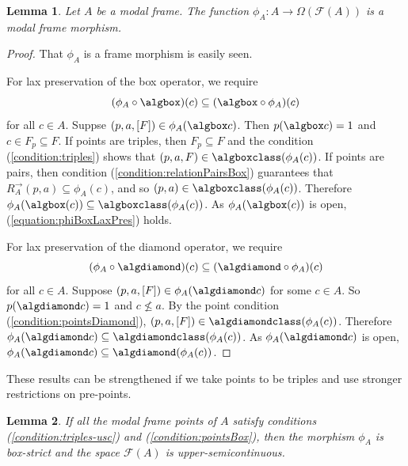 \documentclass{article}[a4paper]
\newtheorem{lemma}{Lemma}%
\theoremstyle{definition}
\newcommand{\Fcal}{\mathcal{F}} %
\newcommand{\relsp}{\mathbf{RelSp}}
\newcommand{\mfrm}{\mathbf{MFrm}}
\newcommand{\dirim}{^{\rightarrow\!}}
\begin{document}
\begin{lemma}
Let $A$ be a modal frame. The function $\phi _A : A \longrightarrow \Omega (\Fcal (A))$ is a modal frame morphism. 
\end{lemma}

\begin{proof}
    That $\phi_A$ is a frame morphism is easily seen. 
    
    For lax preservation of the box operator, we require
    \begin{equation}
    \label{equation:phiBoxLaxPres}
        (\phi_A \circ \algbox )(c)\subseteq (\algbox \circ \phi _A)(c) 
    \end{equation}
    for all $c \in A$. 
    Suppse $(p,a,[F]) \in \phi_A ( \algbox c)$. Then $p(\algbox c)=1$ and $c \in F_p \subseteq F$. 
    If points are triples, then $F_p \subseteq F$ and the condition (\ref{condition:triples}) shows that $(p,a,F) \in \algboxclass (\phi_A(c))$. 
    If points are pairs, then condition (\ref{condition:relationPairsBox}) guarantees that $R_A \dirim (p,a) \subseteq \phi_A (c)$, and so  $(p,a) \in \algboxclass (\phi_A(c))$.
    Therefore $\phi_A (\algbox (c))\subseteq \algboxclass (\phi _A (c))$. As $\phi_A (\algbox (c))$ is open, (\ref{equation:phiBoxLaxPres}) holds.

    For lax preservation of the diamond operator, 
    we require
    \begin{equation}
    \label{equation:phiDiamondLaxPres}
        (\phi_A \circ \algdiamond)(c) \subseteq (\algdiamond \circ \phi _A )(c)
    \end{equation}
    for all $c \in A$. 
    Suppose $(p,a,[F]) \in \phi_A (\algdiamond c)$ for some $c \in A$. So $p(\algdiamond c)=1$ and $c\nleq a$. By the point condition (\ref{condition:pointsDiamond}), $(p,a,[F]) \in \algdiamondclass (\phi_A (c))$. Therefore $\phi_A (\algdiamond c) \subseteq \algdiamondclass (\phi_A (c))$. As 
    $\phi_A (\algdiamond c)$ is open, 
    $\phi_A ( \algdiamond c) \subseteq \algdiamond (\phi _A (c))$.
\end{proof}

These results can be strengthened if we take points to be triples and use stronger restrictions on pre-points. 

\begin{lemma}
\label{result:uscTripleImplyBoxStrict}
If all the modal frame points of $A$ satisfy conditions (\ref{condition:triples-usc}) and (\ref{condition:pointsBox}), then the morphism $\phi_A$ is box-strict and the space $\Fcal (A)$ is upper-semicontinuous. 
\end{lemma}
\end{document}
